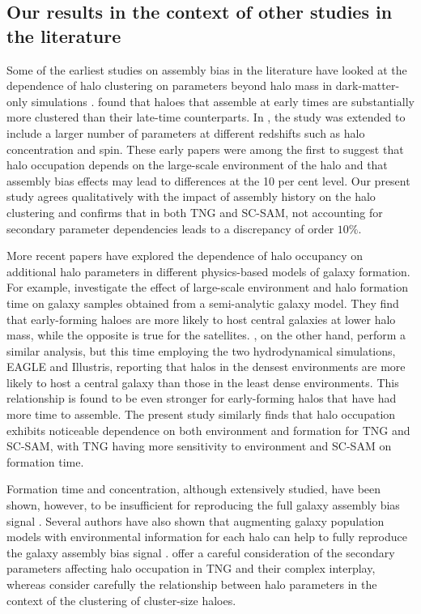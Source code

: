 \documentclass[fleqn,usenatbib]{mnras}
\begin{document}
\subsection{Our results in the context of other studies in the literature} 

Some of the earliest studies on assembly bias in the literature have looked at the dependence of halo clustering on parameters beyond halo mass in dark-matter-only simulations \citep[e.g.][]{2005MNRAS.363L..66G,2007MNRAS.377L...5G}. \citet{2005MNRAS.363L..66G} found that haloes that assemble at early times are substantially more clustered than their late-time counterparts. In \citet{2007MNRAS.377L...5G}, the study was extended to include a larger number of parameters at different redshifts such as halo concentration and spin. These early papers were among the first to suggest that halo occupation depends on the large-scale environment of the halo and that assembly bias effects may lead to differences at the 10 per cent level.
Our present study agrees qualitatively with the impact of assembly history on the halo clustering and confirms that in both TNG and SC-SAM, not accounting for secondary parameter dependencies leads to a discrepancy of order $10\%$.

More recent papers have explored the dependence of halo occupancy on additional halo parameters in different physics-based models of galaxy formation. For example, \citet{2018ApJ...853...84Z} investigate the effect of large-scale environment and halo formation time on galaxy samples obtained from a semi-analytic galaxy model. They find that early-forming haloes are more likely to host central galaxies at lower halo mass, while the opposite is true for the satellites. \citet{2018MNRAS.480.3978A}, on the other hand, perform a similar analysis, but this time employing the two hydrodynamical simulations, EAGLE and Illustris, reporting that halos in the densest environments are more likely to host a central galaxy than those in the least dense environments. This relationship is found to be even stronger for early-forming halos that have had more time to assemble. The present study similarly finds that halo occupation exhibits noticeable dependence on both environment and formation for TNG and SC-SAM, with TNG having more sensitivity to environment and SC-SAM on formation time.

Formation time and concentration, although extensively studied, have been shown, however, to be insufficient for reproducing the full galaxy assembly bias signal \citep[e.g.][]{2007MNRAS.374.1303C,2020MNRAS.493.5506H}. Several authors have also shown that augmenting galaxy population models with environmental information for each halo can help to fully reproduce the galaxy assembly bias signal \citep[e.g.][]{2021MNRAS.501.1603H,2021MNRAS.504.5205C,2021MNRAS.502.3242X}. \citet{sownak} offer a careful consideration of the secondary parameters affecting halo occupation in TNG and their complex interplay, whereas \citet{2018MNRAS.474.5143M} consider carefully the relationship between halo parameters in the context of the clustering of cluster-size haloes.
\end{document}
